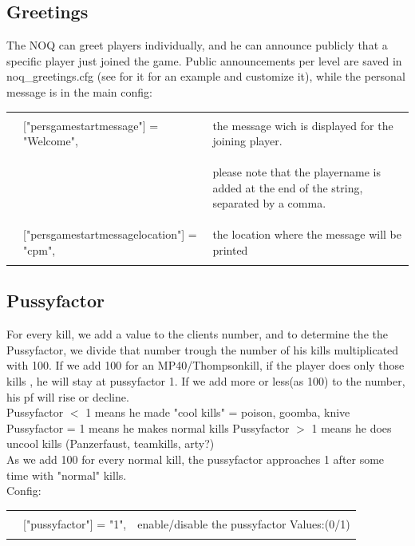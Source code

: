 \documentclass[12pt,a4paper]{article}
\begin{document}
\subsection{Greetings}

The NOQ can greet players individually, and he can announce publicly that a specific player just joined the game.
Public announcements per level are saved in noq\_greetings.cfg (see for it for an example and customize it), while the personal message is in the main config:
\\
\begin{tabular}{l l|l}
\hline & & \\
 &	["persgamestartmessage"] = "Welcome", & the message wich is displayed for the joining player.	\\
 & & \begin{tiny}
please note that the playername is added at the end of the string, separated by a comma.
\end{tiny} \\
 &	["persgamestartmessagelocation"] = "cpm",			& the location where the message will be printed	\\ 
 & &  \\
 \hline
\end{tabular}

\subsection{Pussyfactor}

For every kill, we add a value to the clients number, and to determine the the Pussyfactor, we divide that number trough the number of his kills multiplicated with 100.
If we add 100 for an MP40/Thompsonkill, if the player does only those kills , he will stay at pussyfactor 1.
If we add more or less(as 100) to the number, his pf will rise or decline.
 \\
Pussyfactor $<$ 1 		means he made "cool kills" = poison, goomba, knive
Pussyfactor = 1 		means he makes normal kills
Pussyfactor $>$ 1      means he does uncool kills (Panzerfaust, teamkills, arty?)
\\
As we add 100 for every normal kill, the pussyfactor approaches 1 after some time with "normal" kills.
\\
Config:\\ 
\begin{tabular}{l l|l}
\hline & & \\
 & ["pussyfactor"] = "1", & enable/disable the pussyfactor Values:(0/1) \\
  & &  \\
 \hline
\end{tabular}
\end{document}
